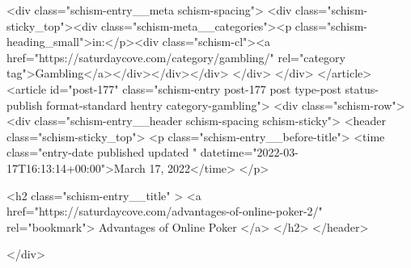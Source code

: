 {		<div class="schism-entry__meta schism-spacing">			<div class="schism-sticky_top"><div class="schism-meta__categories"><p class="schism-heading_small">in:</p><div class="schism-cl"><a href="https://saturdaycove.com/category/gambling/" rel="category tag">Gambling</a></div></div></div>		</div>
	</div>
</article>
<article id="post-177" class="schism-entry post-177 post type-post status-publish format-standard hentry category-gambling">
	<div class="schism-row">		<div class="schism-entry__header schism-spacing schism-sticky">			<header class="schism-sticky_top">				<p class="schism-entry__before-title">
					<time class="entry-date published updated " datetime="2022-03-17T16:13:14+00:00">March 17, 2022</time>				</p>

				<h2 class="schism-entry__title" >
					<a href="https://saturdaycove.com/advantages-of-online-poker-2/" rel="bookmark">
						Advantages of Online Poker					</a>
				</h2>
			</header>

					</div>

}
